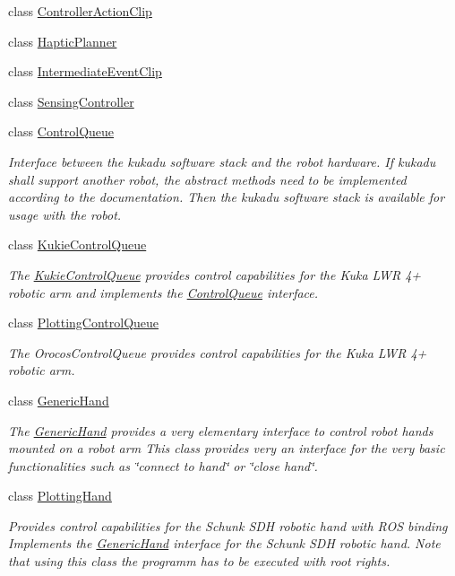\begin{DoxyCompactItemize}
class \hyperlink{classkukadu_1_1ControllerActionClip}{Controller\-Action\-Clip}
\item 
class \hyperlink{classkukadu_1_1HapticPlanner}{Haptic\-Planner}
\item 
class \hyperlink{classkukadu_1_1IntermediateEventClip}{Intermediate\-Event\-Clip}
\item 
class \hyperlink{classkukadu_1_1SensingController}{Sensing\-Controller}
\item 
class \hyperlink{classkukadu_1_1ControlQueue}{Control\-Queue}
\begin{DoxyCompactList}\small\item\em Interface between the kukadu software stack and the robot hardware. If kukadu shall support another robot, the abstract methods need to be implemented according to the documentation. Then the kukadu software stack is available for usage with the robot. \end{DoxyCompactList}\item 
class \hyperlink{classkukadu_1_1KukieControlQueue}{Kukie\-Control\-Queue}
\begin{DoxyCompactList}\small\item\em The \hyperlink{classkukadu_1_1KukieControlQueue}{Kukie\-Control\-Queue} provides control capabilities for the Kuka L\-W\-R 4+ robotic arm and implements the \hyperlink{classkukadu_1_1ControlQueue}{Control\-Queue} interface. \end{DoxyCompactList}\item 
class \hyperlink{classkukadu_1_1PlottingControlQueue}{Plotting\-Control\-Queue}
\begin{DoxyCompactList}\small\item\em The Orocos\-Control\-Queue provides control capabilities for the Kuka L\-W\-R 4+ robotic arm. \end{DoxyCompactList}\item 
class \hyperlink{classkukadu_1_1GenericHand}{Generic\-Hand}
\begin{DoxyCompactList}\small\item\em The \hyperlink{classkukadu_1_1GenericHand}{Generic\-Hand} provides a very elementary interface to control robot hands mounted on a robot arm This class provides very an interface for the very basic functionalities such as \char`\"{}connect to hand\char`\"{} or \char`\"{}close hand\char`\"{}. \end{DoxyCompactList}\item 
class \hyperlink{classkukadu_1_1PlottingHand}{Plotting\-Hand}
\begin{DoxyCompactList}\small\item\em Provides control capabilities for the Schunk S\-D\-H robotic hand with R\-O\-S binding Implements the \hyperlink{classkukadu_1_1GenericHand}{Generic\-Hand} interface for the Schunk S\-D\-H robotic hand. Note that using this class the programm has to be executed with root rights. \end{DoxyCompactList}\item 

\end{DoxyCompactItemize}
